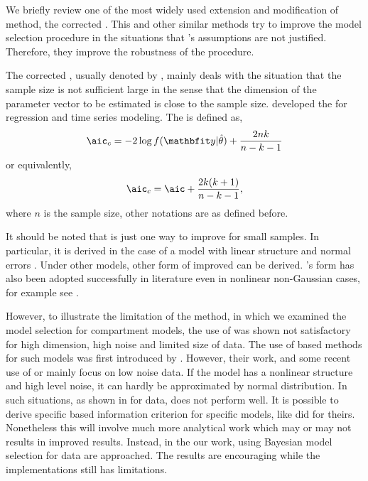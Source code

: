 We briefly review one of the most widely used extension and modification of
\aic method, the corrected \aic. This and other similar methods try to improve
the model selection procedure in the situations that
\cite{Akaike:1973uc}'s assumptions are not justified. Therefore, they
improve the robustness of the \aic procedure.

The corrected \aic, usually denoted by \aicc, mainly deals with the situation
that the sample size is not sufficient large in the sense that the dimension
of the parameter vector to be estimated is close to the sample size.
\cite{Hurvich:1989ev} developed the \aicc for regression and time series
modeling. The \aicc is defined as,
\begin{equation}
  \text{\aicc} = -2\log f(\data|\hat\theta) + \frac{2nk}{n-k-1}
\end{equation}
or equivalently,
\begin{equation}
  \text{\aicc} = \text{\aic} + \frac{2k(k+1)}{n-k-1},
\end{equation}
where $n$ is the sample size, other notations are as defined before.

It should be noted that \aicc is just one way to improve \aic for small
samples. In particular, it is derived in the case of a model with linear
structure and normal errors \cite{Hurvich:1989ev, Burnham:2002wc}. Under other
models, other form of improved \aic can be derived. \cite{Hurvich:1989ev}'s
form has also been adopted successfully in literature even in nonlinear
non-Gaussian cases, for example see \cite{Turkheimer:2003iy}.

However, to illustrate the limitation of the \aicc method, in
\cite{Zhou:2011uo} which we examined the model selection for compartment
models, the use of \aicc was shown not satisfactory for high dimension, high
noise and limited size of data. The use of \aic based methods for such models
was first introduced by \cite{Hawkins:1986ha}. However, their work, and some
recent use of \aic or \aicc mainly focus on low noise data. If the model has a
nonlinear structure and high level noise, it can hardly be approximated by
normal distribution. In such situations, as shown in \cite{Zhou:2011uo} for
\pet data, \aicc does not perform well. It is possible to derive specific \aic
based information criterion for specific models, like \cite{Hurvich:1989ev}
did for theirs. Nonetheless this will involve much more analytical work which
may or may not results in improved results.  Instead, in the our work, using
Bayesian model selection for \pet data are approached. The results are
encouraging while the implementations still has limitations.


